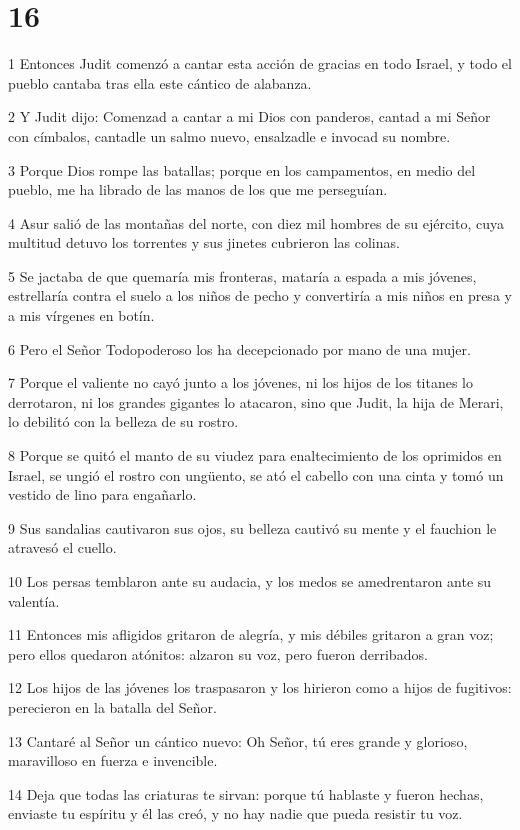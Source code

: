 \chapter{16}

\par 1 Entonces Judit comenzó a cantar esta acción de gracias en todo Israel, y todo el pueblo cantaba tras ella este cántico de alabanza.
\par 2 Y Judit dijo: Comenzad a cantar a mi Dios con panderos, cantad a mi Señor con címbalos, cantadle un salmo nuevo, ensalzadle e invocad su nombre.
\par 3 Porque Dios rompe las batallas; porque en los campamentos, en medio del pueblo, me ha librado de las manos de los que me perseguían.
\par 4 Asur salió de las montañas del norte, con diez mil hombres de su ejército, cuya multitud detuvo los torrentes y sus jinetes cubrieron las colinas.
\par 5 Se jactaba de que quemaría mis fronteras, mataría a espada a mis jóvenes, estrellaría contra el suelo a los niños de pecho y convertiría a mis niños en presa y a mis vírgenes en botín.
\par 6 Pero el Señor Todopoderoso los ha decepcionado por mano de una mujer.
\par 7 Porque el valiente no cayó junto a los jóvenes, ni los hijos de los titanes lo derrotaron, ni los grandes gigantes lo atacaron, sino que Judit, la hija de Merari, lo debilitó con la belleza de su rostro.
\par 8 Porque se quitó el manto de su viudez para enaltecimiento de los oprimidos en Israel, se ungió el rostro con ungüento, se ató el cabello con una cinta y tomó un vestido de lino para engañarlo.
\par 9 Sus sandalias cautivaron sus ojos, su belleza cautivó su mente y el fauchion le atravesó el cuello.
\par 10 Los persas temblaron ante su audacia, y los medos se amedrentaron ante su valentía.
\par 11 Entonces mis afligidos gritaron de alegría, y mis débiles gritaron a gran voz; pero ellos quedaron atónitos: alzaron su voz, pero fueron derribados.
\par 12 Los hijos de las jóvenes los traspasaron y los hirieron como a hijos de fugitivos: perecieron en la batalla del Señor.
\par 13 Cantaré al Señor un cántico nuevo: Oh Señor, tú eres grande y glorioso, maravilloso en fuerza e invencible.
\par 14 Deja que todas las criaturas te sirvan: porque tú hablaste y fueron hechas, enviaste tu espíritu y él las creó, y no hay nadie que pueda resistir tu voz.
